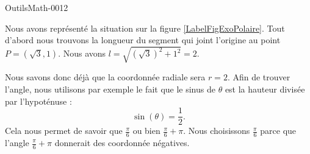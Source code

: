 
\begin{corrige}{OutilsMath-0012}

	Nous avons représenté la situation sur la figure \ref{LabelFigExoPolaire}. Tout d'abord nous trouvons la longueur du segment qui joint l'origine au point $P=(\sqrt{3},1)$. Nous avons $l=\sqrt{ (\sqrt{3})^2+1^2 }=2$.
	\newcommand{\CaptionFigExoPolaire}{Il s'agit de trouver $l$ et $\theta$ en sachant que $x=\sqrt{3}$ et $y=1$.}
	
	Nous savons donc déjà que la coordonnée radiale sera $r=2$. Afin de trouver l'angle, nous utilisons par exemple le fait que le sinus de $\theta$ est la hauteur divisée par l'hypoténuse :
	\begin{equation}
		\sin(\theta)=\frac{ 1 }{ 2 }.
	\end{equation}
	Cela nous permet de savoir que $\frac{ \pi }{ 6 }$ ou bien $\frac{ \pi }{ 6 }+\pi$. Nous choisissons $\frac{ \pi }{ 6 }$ parce que l'angle $\frac{ \pi }{ 6 }+\pi$ donnerait des coordonnée négatives.

\end{corrige}
